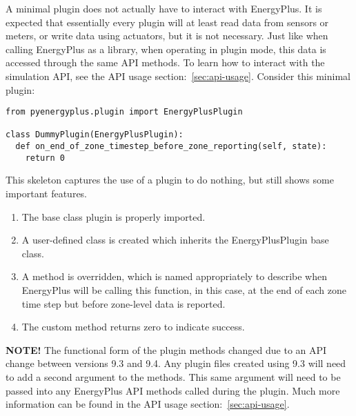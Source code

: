 A minimal plugin does not actually have to interact with EnergyPlus.
It is expected that essentially every plugin will at least read data from sensors or meters, or write data using actuators, but it is not necessary.
Just like when calling EnergyPlus as a library, when operating in plugin mode, this data is accessed through the same API methods.
To learn how to interact with the simulation API, see the API usage section:~\ref{sec:api-usage}.
Consider this minimal plugin:

\begin{lstlisting}
from pyenergyplus.plugin import EnergyPlusPlugin

class DummyPlugin(EnergyPlusPlugin):
  def on_end_of_zone_timestep_before_zone_reporting(self, state):
    return 0
\end{lstlisting}

This skeleton captures the use of a plugin to do nothing, but still shows some important features.
\begin{enumerate}
    \item The base class plugin is properly imported.
    \item A user-defined class is created which inherits the EnergyPlusPlugin base class.
    \item A method is overridden, which is named appropriately to describe when EnergyPlus will be calling this function, in this case, at the end of each zone time step but before zone-level data is reported.
    \item The custom method returns zero to indicate success.
\end{enumerate}

\textbf{NOTE!}  The functional form of the plugin methods changed due to an API change between versions 9.3 and 9.4.
Any plugin files created using 9.3 will need to add a second argument to the methods.
This same argument will need to be passed into any EnergyPlus API methods called during the plugin.
Much more information can be found in the API usage section:~\ref{sec:api-usage}.

